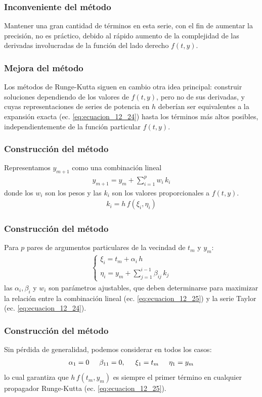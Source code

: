 \begin{frame}
\frametitle{Inconveniente del método}
Mantener una gran cantidad de términos en esta serie, con el fin de aumentar la precisión, no es práctico, debido al rápido aumento de la complejidad de las derivadas involucradas de la función del lado derecho $f(t, y)$.
\end{frame}
\begin{frame}
\frametitle{Mejora del método}
Los métodos de Runge-Kutta siguen en cambio otra idea principal: construir soluciones dependiendo de los valores de $f (t, y)$, pero no de sus derivadas, y cuyas representaciones de series de potencia en $h$ deberían ser equivalentes a la expansión exacta (ec. \ref{eq:ecuacion_12_24}) hasta los términos más altos posibles, independientemente de la función particular $f (t, y)$.
\end{frame}
\begin{frame}
\frametitle{Construcción del método}
Representamos $y_{m+1}$ como una combinación lineal
\begin{align}
y_{m+1} = y_{m} + \sum_{i=1}^{p} w_{i} \, k_{i}
\label{eq:ecuacion_12_25}
\end{align}
donde los $w_{i}$ son los pesos y las $k_{i}$ son los valores proporcionales a $f(t, y)$.
\begin{align*}
k_{i} = h \, f(\xi_{i}, \eta_{i})
\end{align*}
\end{frame}
\begin{frame}
\frametitle{Construcción del método}
Para $p$ pares de argumentos particulares de la vecindad de $t_{m}$ y $y_{m}$:
\begin{align}
\begin{cases}
\xi_{i} = t_{m} + \alpha_{i} \, h \\[0.5em]
\eta_{i} = y_{m} + \displaystyle \sum_{j=1}^{i-1} \beta_{ij} \, k_{j}
\end{cases}
\label{eq:ecuacion_12_26}
\end{align}
las $\alpha_{i}, \beta_{i}$ y $w_{i}$ son parámetros ajustables, que deben determinarse para maximizar la relación entre la combinación lineal (ec. \ref{eq:ecuacion_12_25}) y la serie Taylor (ec. \ref{eq:ecuacion_12_24}).
\end{frame}
\begin{frame}
\frametitle{Construcción del método}
Sin pérdida de generalidad, podemos considerar en todos los casos:
\begin{align}
\alpha_{1} = 0 \hspace{0.5cm} \beta_{11} = 0, \hspace{0.5cm} \xi_{1} = t_{m} \hspace{0.5cm} \eta_{1} = y_{m}
\label{eq:ecuacion_12_27}
\end{align}
lo cual garantiza que $h \, f(t_{m}, y_{m})$ es siempre el primer término en cualquier propagador Runge-Kutta (ec. \ref{eq:ecuacion_12_25}).
\end{frame}
